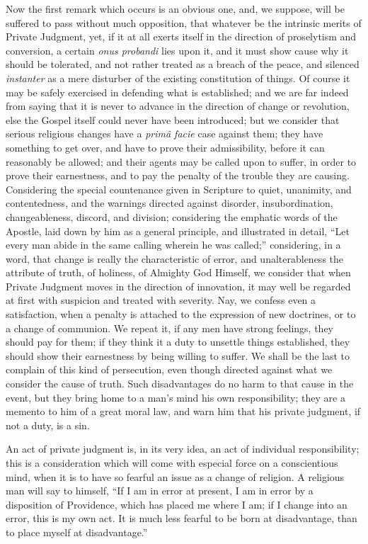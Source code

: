 Now the first remark which occurs is an obvious one, and, we
suppose, will be suffered to pass without much opposition, that
whatever be the intrinsic merits of Private Judgment, yet, if it at
all exerts itself in the direction of proselytism and conversion, a
certain \emph{onus probandi} lies upon it, and it must show cause why
it should be tolerated, and not rather treated as a breach of the
peace, and silenced \emph{instanter} as a mere disturber of the
existing constitution of things. Of course it may be safely exercised
in defending what is established; and we are far indeed from saying
that it is never to advance in the direction of change or revolution,
else the Gospel itself could never have been introduced; but we
consider that serious religious changes have a \emph{primâ facie}
case against them; they have something to get over, and have to prove
their admissibility, before it can reasonably be allowed; and their
agents may be called upon to suffer, in order to prove their
earnestness, and to pay the penalty of the trouble they are causing.
Considering the special countenance given in Scripture to quiet,
unanimity, and contentedness, and the warnings directed against
disorder, insubordination, changeableness, discord, and division;
considering the emphatic words of the Apostle, laid down by him
as a general principle, and illustrated in detail, ``Let every man
abide in the same calling wherein he was called;'' considering, in
a word, that change is really the characteristic of error, and
unalterableness the attribute of truth, of holiness, of Almighty God
Himself, we consider that when Private Judgment moves in the direction
of innovation, it may well be regarded at first with suspicion and
treated with severity. Nay, we confess even a satisfaction, when a
penalty is attached to the expression of new doctrines, or to a change
of communion. We repeat it, if any men have strong feelings, they
should pay for them; if they think it a duty to unsettle things
established, they should show their earnestness by being willing to
suffer. We shall be the last to complain of this kind of persecution,
even though directed against what we consider the cause of truth. Such
disadvantages do no harm to that cause in the event, but they bring
home to a man's mind his own responsibility; they are a memento to him
of a great moral law, and warn him that his private judgment, if not a
duty, is a sin.

An act of private judgment is, in its very idea, an act of
individual responsibility; this is a consideration which will come
with especial force on a conscientious mind, when it is to have so
fearful an issue as a change of religion. A religious man will say to
himself, ``If I am in error at present, I am in error by a
disposition of Providence, which has placed me where I am; if I change
into an error, this is my own act. It is much less fearful to be born
at disadvantage, than to place myself at disadvantage.''

